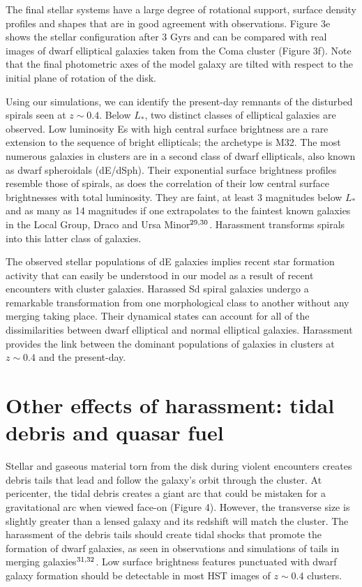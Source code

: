 The final stellar systems have a large degree of rotational support,
surface density profiles and shapes that are in good agreement with
observations.  Figure 3e shows the stellar configuration after 3 Gyrs
and can be compared with real images of dwarf elliptical galaxies
taken from the Coma cluster (Figure 3f).  Note that the final
photometric axes of the model galaxy are tilted with respect to the
initial plane of rotation of the disk.

Using our simulations, we can identify the present-day remnants of
the disturbed spirals seen at $z \sim 0.4$.  Below $L_*$, two distinct
classes of elliptical galaxies are observed.  Low luminosity Es with
high central surface brightness are a rare extension to the sequence
of bright ellipticals; the archetype is M32. The most numerous
galaxies in clusters are in a second class of dwarf ellipticals, also
known as dwarf spheroidals (dE/dSph).  Their exponential surface
brightness profiles resemble those of spirals, as does the correlation
of their low central surface brightnesses with total luminosity.  They
are faint, at least 3 magnitudes below $L_*$ and as many as 14
magnitudes if one extrapolates to the faintest known galaxies in the
Local Group, Draco and Ursa Minor$^{\bf\rm 29,30}$.  Harassment
transforms spirals into this latter class of galaxies.

The observed stellar populations of dE galaxies implies recent star
formation activity that can easily be understood in our model as a
result of recent encounters with cluster galaxies.  Harassed Sd spiral
galaxies undergo a remarkable transformation from one morphological
class to another without any merging taking place.  Their dynamical
states can account for all of the dissimilarities between dwarf
elliptical and normal elliptical galaxies.  Harassment provides the
link between the dominant populations of galaxies in clusters at $z
\sim 0.4 $ and the present-day.

\section{Other effects of harassment:  tidal debris and quasar fuel}

Stellar and gaseous material torn from the disk during violent
encounters creates debris tails that lead and follow the galaxy's
orbit through the cluster.  At pericenter, the tidal debris creates a
giant arc that could be mistaken for a gravitational arc when viewed
face-on (Figure 4).  However, the transverse size is slightly greater
than a lensed galaxy and its redshift will match the cluster.  The
harassment of the debris tails should create tidal shocks that promote
the formation of dwarf galaxies, as seen in observations and
simulations of tails in merging galaxies$^{\bf\rm 31,32}$.  Low
surface brightness features punctuated with dwarf galaxy formation
should be detectable in most HST images of $z \sim 0.4$ clusters.

